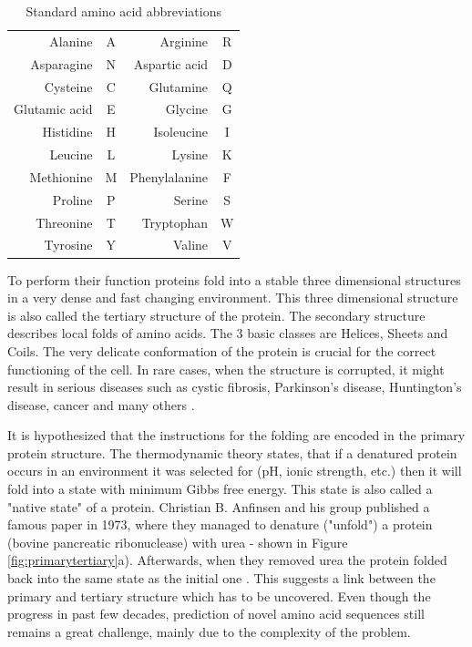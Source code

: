 \begin{table}
    \centering
    \begin{tabular}{r|c|r|c|}
        Alanine & A & Arginine & R \\
        Asparagine & N & Aspartic acid & D \\
        Cysteine & C & Glutamine & Q \\
        Glutamic acid & E & Glycine & G \\
        Histidine & H & Isoleucine & I \\
        Leucine & L & Lysine & K \\
        Methionine & M & Phenylalanine & F \\
        Proline & P & Serine & S \\
        Threonine & T & Tryptophan & W \\
        Tyrosine & Y & Valine & V
    \end{tabular}
    \caption{Standard amino acid abbreviations}
    \label{tab:aa_codes}
\end{table}

To perform their function proteins fold into a stable three dimensional structures in a very dense and fast changing environment.
This three dimensional structure is also called the tertiary structure of the protein. 
The secondary structure describes local folds of amino acids. The 3 basic classes are Helices, Sheets and Coils.
The very delicate conformation of the protein is crucial for the correct functioning of the cell.
In rare cases, when the structure is corrupted, it might result in serious diseases such as cystic fibrosis, Parkinson's disease, Huntington's disease, cancer and many others \cite{protein_misfolding_diseases}.

It is hypothesized that the instructions for the folding are encoded in the primary protein structure. 
The thermodynamic theory states, that if a denatured protein occurs in an environment it was selected for (pH, ionic strength, etc.) then it will fold into a state with minimum Gibbs free energy.
This state is also called a "native state" of a protein. 
Christian B. Anfinsen and his group published a famous paper in 1973, where they managed to denature ("unfold") a protein (bovine pancreatic ribonuclease) with urea - shown in Figure \ref{fig:primarytertiary}a). 
Afterwards, when they removed urea the protein folded back into the same state as the initial one \cite{anfinsen}. This suggests a link between the primary and tertiary structure which has to be uncovered. Even though the progress in past few decades, prediction of novel amino acid sequences still remains a great challenge, mainly due to the complexity of the problem.%
    
